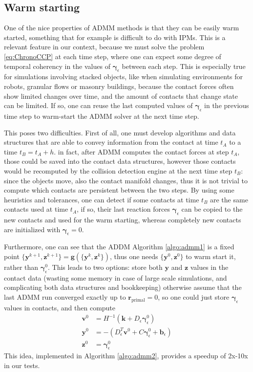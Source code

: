 \documentclass[final,3p]{elsarticle}
\newcommand{\vect}[1]{\bm{#1}}
\begin{document}
\subsection{Warm starting}

One of the nice properties of ADMM methods is that they can be easily warm started, something that for example is difficult to do with IPMs. 
This is a relevant feature in our context, because we must solve the problem \eqref{eq:ChronoCCP} at each time step, where one can expect some degree of temporal coherency in the values of $\vect{\gamma}_\epsilon$ between each step. This is especially true for simulations involving stacked objects, like when simulating environments for robots, granular flows or masonry buildings, because the contact forces often show limited changes over time, and the amount of contacts that change state can be limited. If so, one can reuse the last computed values of $\vect{\gamma}_\epsilon$ in the previous time step to warm-start the ADMM solver at the next time step.

This poses two difficulties. First of all, one must develop algorithms and data structures that are able to convey information from the contact at time $t_A$ to a time $t_B = t_A+h$. in fact, after ADMM computes the contact forces at step $t_A$, those could be saved into the contact data structures, however those contacts would be recomputed by the collision detection engine at the next time step $t_B$: since the objects move, also the contact manifold changes, thus it is not trivial to compute which contacts are persistent between the two steps. By using some heuristics and tolerances, one can detect if some contacts at time $t_B$ are the same contacts used at time $t_A$, if so, their last reaction forces $\vect{\gamma}_\epsilon$ can be copied to the new contacts and used for the warm starting, whereas completely new contacts are initialized with $\vect{\gamma}_\epsilon = 0$. 

Furthermore, one can see that the ADDM Algorithm \ref{algo:admm1} is a fixed point 
$\{\vect{y}^{k+1},\vect{z}^{k+1}\} = \vect{g} \left(\{\vect{y}^k,\vect{z}^k\}\right)$, thus one needs $\{\vect{y}^0,\vect{z}^0\}$ to warm start it, rather than $\vect{\gamma}_\epsilon^0$. This leads to two options: store both $\vect{y}$ and $\vect{z}$ values in the contact data (wasting some memory in case of large scale simulations, and complicating both data structures and bookkeeping) otherwise assume that the last ADMM run converged exactly up to $\vect{r}_{\text{primal}}=0$, so one could just store $\vect{\gamma}_\epsilon$ values in contacts, and then compute
%
\begin{align}
\vect{v}^0 &= H^{-1}( \vect{k} + D_\epsilon \vect{\gamma}_\epsilon^0) \nonumber \\
\vect{y}^0 &= - (D_\epsilon^T \vect{v}^0 + C \vect{\gamma}_\epsilon^0 + \vect{b}_\epsilon)  \nonumber \\
\vect{z}^0 &= \vect{\gamma}_\epsilon^0 \nonumber
\end{align}
This idea, implemented in Algorithm \ref{algo:admm2}, provides a speedup of 2x-10x in our tests.
\end{document}

